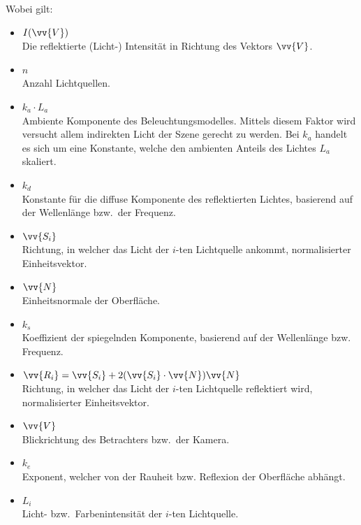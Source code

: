 Wobei gilt:

\begin{itemize}
    \item $I(\vv{V})$\\
        Die reflektierte (Licht-) Intensität in Richtung des Vektors
        $\vv{V}$.

    \item $n$\\
        Anzahl Lichtquellen.

    \item $k_{a} \cdot L_{a}$\\
        Ambiente Komponente des Beleuchtungsmodelles. Mittels diesem
        Faktor wird versucht allem indirekten Licht der Szene gerecht zu
        werden. Bei $k_{a}$ handelt es sich um eine Konstante, welche
        den ambienten Anteils des Lichtes $L_{a}$ skaliert.

    \item $k_{d}$\\
        Konstante für die diffuse Komponente des reflektierten Lichtes,
        basierend auf der Wellenlänge bzw.\ der Frequenz.

    \item $\vv{S_{i}}$\\
        Richtung, in welcher das Licht der $i$-ten Lichtquelle ankommt,
        normalisierter Einheitsvektor.

    \item $\vv{N}$\\
        Einheitsnormale der Oberfläche.

    \item $k_{s}$\\
        Koeffizient der spiegelnden Komponente, basierend auf der
        Wellenlänge bzw. Frequenz.

    \item $\vv{R_{i}} = \vv{S_{i}} + 2(\vv{S_{i}} \cdot \vv{N})\vv{N}$\\
        Richtung, in welcher das Licht der $i$-ten Lichtquelle
        reflektiert wird, normalisierter Einheitsvektor.

    \item $\vv{V}$\\
        Blickrichtung des Betrachters bzw.\ der Kamera.

    \item $k_{e}$\\
        Exponent, welcher von der Rauheit
        bzw.  Reflexion der Oberfläche abhängt.
    \item $L_{i}$\\
        Licht- bzw.\ Farbenintensität der $i$-ten Lichtquelle.
\end{itemize}

